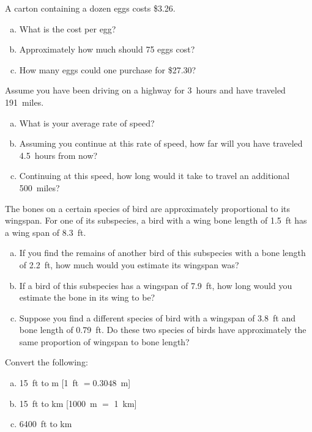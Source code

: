 \documentclass[11pt,letterpaper]{article}
\begin{document}
\newpage



 A carton containing a dozen eggs costs \$3.26.
\begin{enumerate}[(a)]
\item What is the cost per egg?
\item Approximately how much should 75 eggs cost?
\item How many eggs could one purchase for \$27.30?
\end{enumerate}



\newpage



 Assume you have been driving on a highway for 3~hours and have traveled 191~miles.
\begin{enumerate}[(a)]
\item What is your average rate of speed?
\item Assuming you continue at this rate of speed, how far will you have traveled 4.5~hours from now?
\item Continuing at this speed, how long would it take to travel an additional 500~miles?
\end{enumerate}



\newpage



 The bones on a certain species of bird are approximately proportional to its wingspan. For one of its subspecies, a bird with a wing bone length of 1.5~ft has a wing span of 8.3~ft. 
\begin{enumerate}[(a)]
\item If you find the remains of another bird of this subspecies with a bone length of 2.2~ft, how much would you estimate its wingspan was?
\item If a bird of this subspecies has a wingspan of 7.9~ft, how long would you estimate the bone in its wing to be?
\item Suppose you find a different species of bird with a wingspan of 3.8~ft and bone length of 0.79~ft. Do these two species of birds have approximately the same proportion of wingspan to bone length?
\end{enumerate}



\newpage



 Convert the following:
\begin{enumerate}[(a)]
\item 15~ft to m [1~ft $= 0.3048$~m]
\item 15~ft to km [1000~m $=$ 1~km]
\item 6400~ft to km
\end{enumerate}
\end{document}
